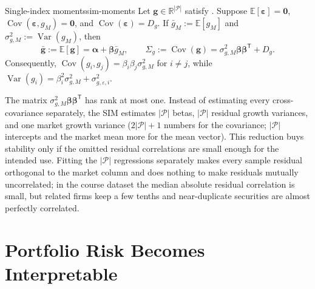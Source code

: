 \documentclass[11pt]{article}
\newcommand{\R}{\mathbb{R}}
\newcommand{\E}{\mathbb{E}}
\newcommand{\Cov}{\operatorname{Cov}}
\newcommand{\Var}{\operatorname{Var}}
\newcommand{\np}{|\mathcal P|}
\begin{document}
\begin{proposition}{Single-index moments}{sim-moments}
Let $\mathbf g\in\R^{\np}$ satisfy . Suppose $\E[\boldsymbol\varepsilon]=\mathbf0$, $\Cov(\boldsymbol\varepsilon,g_M)=\mathbf0$, and $\Cov(\boldsymbol\varepsilon)=D_g$. If $\bar g_M:=\E[g_M]$ and $\sigma_{g,M}^2:=\Var(g_M)$, then
\begin{equation}
  \label{eq:sim-moments}
  \bar{\mathbf g}:=\E[\mathbf g]
  =\boldsymbol\alpha+\boldsymbol\beta\bar g_M,
  \qquad
  \Sigma_g:=\Cov(\mathbf g)
  =\sigma_{g,M}^2\boldsymbol\beta\boldsymbol\beta^{\mathsf T}+D_g.
\end{equation}
Consequently, $\Cov(g_i,g_j)=\beta_i\beta_j\sigma_{g,M}^2$ for $i\neq j$, while $\Var(g_i)=\beta_i^2\sigma_{g,M}^2+\sigma_{g,\varepsilon,i}^2$.
\end{proposition}

The matrix $\sigma_{g,M}^2\boldsymbol\beta\boldsymbol\beta^{\mathsf T}$ has rank at most one. Instead of estimating every cross-covariance separately, the SIM estimates $\np$ betas, $\np$ residual growth variances, and one market growth variance ($2\np+1$ numbers for the covariance; $\np$ intercepts and the market mean more for the mean vector). This reduction buys stability only if the omitted residual correlations are small enough for the intended use. Fitting the $\np$ regressions separately makes every sample residual orthogonal to the market column and does nothing to make residuals mutually uncorrelated; in the course dataset the median absolute residual correlation is small, but related firms keep a few tenths and near-duplicate securities are almost perfectly correlated.

\section{Portfolio Risk Becomes Interpretable}
\end{document}
